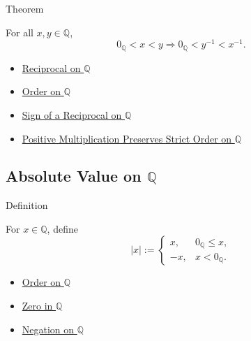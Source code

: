 \begin{theorembox}{Theorem}
\begin{theorem}
\label{thm:reciprocal-reverses-order-on-positives-q}
For all $x,y\in\mathbb{Q}$,
\[
0_{\mathbb{Q}}<x<y
\Longrightarrow
0_{\mathbb{Q}}<y^{-1}<x^{-1}.
\]
\end{theorem}
\end{theorembox}

\begin{dependencies}
\begin{itemize}
  \item \hyperref[def:reciprocal-on-q-classes]{Reciprocal on $\mathbb{Q}$}
  \item \hyperref[def:order-on-q]{Order on $\mathbb{Q}$}
  \item \hyperref[thm:sign-of-reciprocal-q]{Sign of a Reciprocal on $\mathbb{Q}$}
  \item \hyperref[thm:positive-multiplication-preserves-strict-order-on-q]{Positive Multiplication Preserves Strict Order on $\mathbb{Q}$}
\end{itemize}
\end{dependencies}

\subsection*{Absolute Value on $\mathbb{Q}$}

\begin{definitionbox}{Definition}
\begin{definition}
\label{def:absolute-value-on-q}
For $x\in\mathbb{Q}$, define
\[
|x|:=
\begin{cases}
x, & 0_{\mathbb{Q}}\le x,\\
-x, & x<0_{\mathbb{Q}}.
\end{cases}
\]
\end{definition}
\end{definitionbox}

\begin{dependencies}
\begin{itemize}
  \item \hyperref[def:order-on-q]{Order on $\mathbb{Q}$}
  \item \hyperref[def:zero-in-q]{Zero in $\mathbb{Q}$}
  \item \hyperref[def:negation-on-q-classes]{Negation on $\mathbb{Q}$}
\end{itemize}
\end{dependencies}

